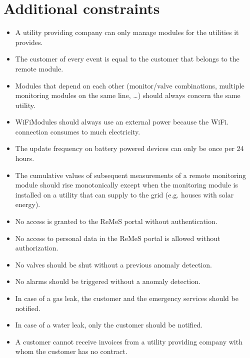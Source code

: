 \chapter{Additional constraints}
\label{additional-constraints}

\begin{itemize}
	\item A utility providing company can only manage modules for the utilities it
	provides.
	\item The customer of every event is equal to the customer that belongs to the
	remote module.
	\item Modules that depend on each other (monitor/valve combinations, multiple
	monitoring modules on the same line, \ldots) should always concern the same
	utility.
	\item WiFiModules should always use an external power because the WiFi.
	connection consumes to much electricity.
	\item The update frequency on battery powered devices can only be once per 24 hours. 
	\item The cumulative values of subsequent measurements of a remote
	monitoring module should rise monotonically except when the monitoring module
	is installed on a utility that can supply to the grid (e.g. houses with solar
	energy).
	\item No access is granted to the ReMeS portal without authentication.
	\item No access to personal data in the ReMeS portal is allowed without
	authorization.
	\item No valves should be shut without a previous anomaly detection.
	\item No alarms should be triggered without a anomaly detection.
	\item In case of a gas leak, the customer and the emergency services should be
	notified.
	\item In case of a water leak, only the customer should be notified.
	\item A customer cannot receive invoices from a utility providing company with
	whom the customer has no contract. 
\end{itemize}